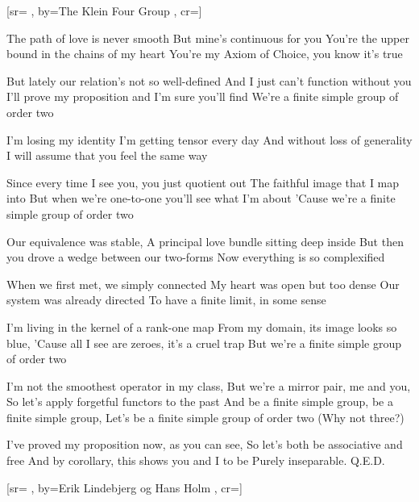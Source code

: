 \documentclass[pdftex,12pt]{article}
\begin{document}
\begin{songs}{}
\endverse
\endsong



[sr={}
,
by={The Klein Four Group}
,
cr={}]\hypertarget{Finite Simple Group (of order two)}{}
\label{song40}

\beginverse
The path of love is never smooth
But mine's continuous for you
You're the upper bound in the chains of my heart
You're my Axiom of Choice, you know it's true

\endverse
\beginverse
But lately our relation's not so well-defined
And I just can't function without you
I'll prove my proposition and I'm sure you'll find
We're a finite simple group of order two

\endverse
\beginverse
I'm losing my identity
I'm getting tensor every day
And without loss of generality
I will assume that you feel the same way

\endverse
\beginverse
Since every time I see you, you just quotient out
The faithful image that I map into
But when we're one-to-one you'll see what I'm about
'Cause we're a finite simple group of order two

\endverse
\beginverse
Our equivalence was stable,
A principal love bundle sitting deep inside
But then you drove a wedge between our two-forms
Now everything is so complexified

\endverse
\beginverse
When we first met, we simply connected
My heart was open but too dense
Our system was already directed
To have a finite limit, in some sense

\endverse
\beginverse
I'm living in the kernel of a rank-one map
From my domain, its image looks so blue,
'Cause all I see are zeroes, it's a cruel trap
But we're a finite simple group of order two

\endverse
\beginverse
I'm not the smoothest operator in my class,
But we're a mirror pair, me and you,
So let's apply forgetful functors to the past
And be a finite simple group,
be a finite simple group,
Let's be a finite simple group of order two (Why not three?)

\endverse
\beginverse
I've proved my proposition now, as you can see,
So let's both be associative and free
And by corollary, this shows you and I to be
Purely inseparable. Q.E.D.

\endverse
\endsong



﻿[sr={}
,
by={Erik Lindebjerg og Hans Holm}
,
cr={}]\hypertarget{Livstræet}{}
\label{song41}


\end{songs}
\end{document}
